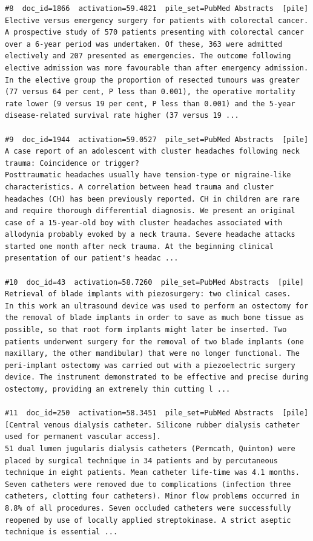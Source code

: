 \begin{verbatim}
#8  doc_id=1866  activation=59.4821  pile_set=PubMed Abstracts  [pile]
Elective versus emergency surgery for patients with colorectal cancer.
A prospective study of 570 patients presenting with colorectal cancer over a 6-year period was undertaken. Of these, 363 were admitted electively and 207 presented as emergencies. The outcome following elective admission was more favourable than after emergency admission. In the elective group the proportion of resected tumours was greater (77 versus 64 per cent, P less than 0.001), the operative mortality rate lower (9 versus 19 per cent, P less than 0.001) and the 5-year disease-related survival rate higher (37 versus 19 ...

#9  doc_id=1944  activation=59.0527  pile_set=PubMed Abstracts  [pile]
A case report of an adolescent with cluster headaches following neck trauma: Coincidence or trigger?
Posttraumatic headaches usually have tension-type or migraine-like characteristics. A correlation between head trauma and cluster headaches (CH) has been previously reported. CH in children are rare and require thorough differential diagnosis. We present an original case of a 15-year-old boy with cluster headaches associated with allodynia probably evoked by a neck trauma. Severe headache attacks started one month after neck trauma. At the beginning clinical presentation of our patient's headac ...

#10  doc_id=43  activation=58.7260  pile_set=PubMed Abstracts  [pile]
Retrieval of blade implants with piezosurgery: two clinical cases.
In this work an ultrasound device was used to perform an ostectomy for the removal of blade implants in order to save as much bone tissue as possible, so that root form implants might later be inserted. Two patients underwent surgery for the removal of two blade implants (one maxillary, the other mandibular) that were no longer functional. The peri-implant ostectomy was carried out with a piezoelectric surgery device. The instrument demonstrated to be effective and precise during ostectomy, providing an extremely thin cutting l ...

#11  doc_id=250  activation=58.3451  pile_set=PubMed Abstracts  [pile]
[Central venous dialysis catheter. Silicone rubber dialysis catheter used for permanent vascular access].
51 dual lumen jugularis dialysis catheters (Permcath, Quinton) were placed by surgical technique in 34 patients and by percutaneous technique in eight patients. Mean catheter life-time was 4.1 months. Seven catheters were removed due to complications (infection three catheters, clotting four catheters). Minor flow problems occurred in 8.8% of all procedures. Seven occluded catheters were successfully reopened by use of locally applied streptokinase. A strict aseptic technique is essential ...


\end{verbatim}
